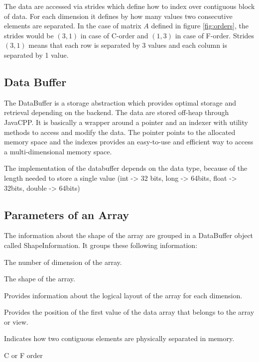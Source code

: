 The data are accessed via strides which define how to index over contiguous block of data. For each dimension it defines by how many values two consecutive elements are separated. In the case of matrix $A$ defined in figure \ref{fig:orders}, the strides would be $(3, 1)$ in case of C-order and $(1, 3)$ in case of F-order. Strides $(3, 1)$ means that each row is separated by 3 values and each column is separated by 1 value.

\subsection{Data Buffer}
The DataBuffer is a storage abstraction which provides optimal storage and retrieval depending on the backend. The data are stored off-heap through JavaCPP. It is basically a wrapper around a pointer and an indexer with utility methods to access and modify the data. 
The pointer points to the allocated memory space and the indexes provides an easy-to-use and efficient way to access a multi-dimensional memory space.

The implementation of the databuffer depends on the data type, because of the length needed to store a single value (int -> 32 bits, long -> 64bits, float -> 32bits, double -> 64bits)


\subsection{Parameters of an Array}
The information about the shape of the array are grouped in a DataBuffer object called ShapeInformation. It groups these following information:

\begin{description}[leftmargin=!,labelwidth=\widthof{\bfseries elementWiseStride}]
	\item [Rank] The number of dimension of the array.
	\item [Shape] The shape of the array.
	\item [Strides] Provides information about the logical layout of the array for each dimension.
	\item [Offset] Provides the position of the first value of the data array that belongs to the array or view.
	\item[ElementWiseStride] Indicates how two contiguous elements are physically separated in memory.
	\item[Order] C or F order
\end{description}


